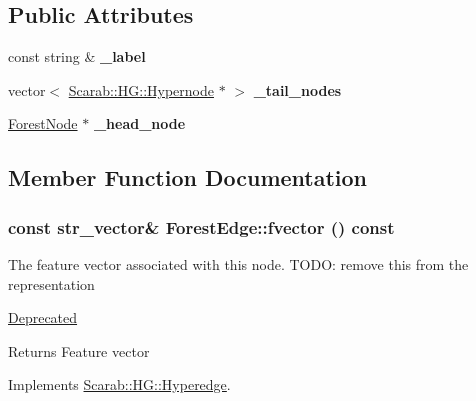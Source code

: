 \subsection*{Public Attributes}
\begin{DoxyCompactItemize}
\item 
\hypertarget{classForestEdge_af35b51c633e5582656e5e2352b6120e8}{
const string \& {\bfseries \_\-label}}
\label{classForestEdge_af35b51c633e5582656e5e2352b6120e8}

\item 
\hypertarget{classForestEdge_a9200cbe59696a3a9c0b35d72e9efcf7c}{
vector$<$ \hyperlink{classScarab_1_1HG_1_1Hypernode}{Scarab::HG::Hypernode} $\ast$ $>$ {\bfseries \_\-tail\_\-nodes}}
\label{classForestEdge_a9200cbe59696a3a9c0b35d72e9efcf7c}

\item 
\hypertarget{classForestEdge_a910b9558426d35ea026025b6a2195886}{
\hyperlink{classForestNode}{ForestNode} $\ast$ {\bfseries \_\-head\_\-node}}
\label{classForestEdge_a910b9558426d35ea026025b6a2195886}

\end{DoxyCompactItemize}


\subsection{Member Function Documentation}
\hypertarget{classForestEdge_a694457d52b715922cb0487d90ff3ab6c}{
\subsubsection[{fvector}]{\setlength{\rightskip}{0pt plus 5cm}const {\bf str\_\-vector}\& ForestEdge::fvector () const}}
\label{classForestEdge_a694457d52b715922cb0487d90ff3ab6c}
The feature vector associated with this node. TODO: remove this from the representation \begin{Desc}
\item[\hyperlink{deprecated__deprecated000003}{Deprecated}]\end{Desc}
\begin{DoxyReturn}{Returns}
Feature vector 
\end{DoxyReturn}


Implements \hyperlink{classScarab_1_1HG_1_1Hyperedge_a0d201ddb955631aadee4c15cc8e709f8}{Scarab::HG::Hyperedge}.

